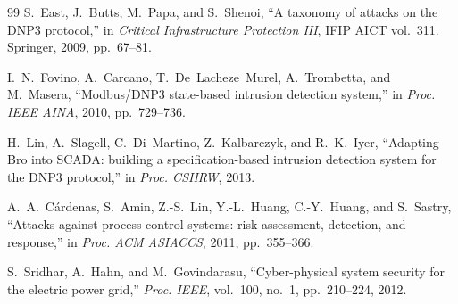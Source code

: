 \documentclass[10pt,a4paper,oneside]{article}
\begin{document}
\begin{thebibliography}{99}
 S.~East, J.~Butts, M.~Papa, and S.~Shenoi, ``A taxonomy of attacks
on the {DNP3} protocol,'' in \emph{Critical Infrastructure Protection III}, IFIP AICT vol.~311.
Springer, 2009, pp.~67--81.

 I.~N.~Fovino, A.~Carcano, T.~De~Lacheze~Murel, A.~Trombetta, and
M.~Masera, ``Modbus/{DNP3} state-based intrusion detection system,'' in \emph{Proc. IEEE
AINA}, 2010, pp.~729--736.

 H.~Lin, A.~Slagell, C.~Di~Martino, Z.~Kalbarczyk, and R.~K.~Iyer,
``Adapting Bro into {SCADA}: building a specification-based intrusion detection system for the
{DNP3} protocol,'' in \emph{Proc. CSIIRW}, 2013.

 A.~A.~C\'ardenas, S.~Amin, Z.-S.~Lin, Y.-L.~Huang, C.-Y.~Huang,
and S.~Sastry, ``Attacks against process control systems: risk assessment, detection, and
response,'' in \emph{Proc. ACM ASIACCS}, 2011, pp.~355--366.

 S.~Sridhar, A.~Hahn, and M.~Govindarasu, ``Cyber-physical system
security for the electric power grid,'' \emph{Proc. IEEE}, vol.~100, no.~1, pp.~210--224, 2012.

\end{thebibliography}
\end{document}
